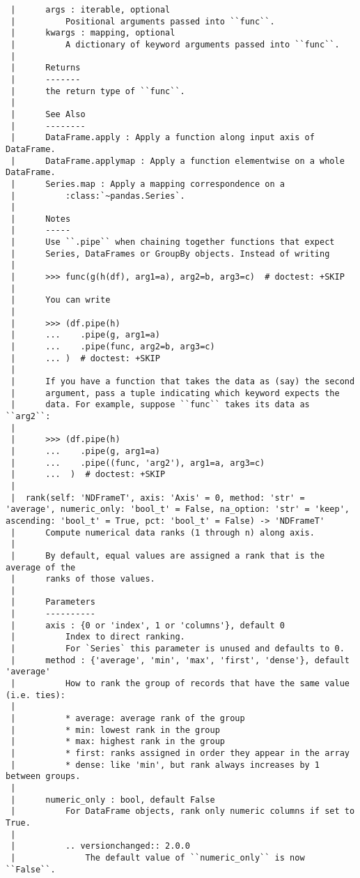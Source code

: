 \documentclass[
  letterpaper,
  DIV=11,
  numbers=noendperiod]{scrreprt}
\begin{document}
\begin{verbatim}
 |      args : iterable, optional
 |          Positional arguments passed into ``func``.
 |      kwargs : mapping, optional
 |          A dictionary of keyword arguments passed into ``func``.
 |      
 |      Returns
 |      -------
 |      the return type of ``func``.
 |      
 |      See Also
 |      --------
 |      DataFrame.apply : Apply a function along input axis of DataFrame.
 |      DataFrame.applymap : Apply a function elementwise on a whole DataFrame.
 |      Series.map : Apply a mapping correspondence on a
 |          :class:`~pandas.Series`.
 |      
 |      Notes
 |      -----
 |      Use ``.pipe`` when chaining together functions that expect
 |      Series, DataFrames or GroupBy objects. Instead of writing
 |      
 |      >>> func(g(h(df), arg1=a), arg2=b, arg3=c)  # doctest: +SKIP
 |      
 |      You can write
 |      
 |      >>> (df.pipe(h)
 |      ...    .pipe(g, arg1=a)
 |      ...    .pipe(func, arg2=b, arg3=c)
 |      ... )  # doctest: +SKIP
 |      
 |      If you have a function that takes the data as (say) the second
 |      argument, pass a tuple indicating which keyword expects the
 |      data. For example, suppose ``func`` takes its data as ``arg2``:
 |      
 |      >>> (df.pipe(h)
 |      ...    .pipe(g, arg1=a)
 |      ...    .pipe((func, 'arg2'), arg1=a, arg3=c)
 |      ...  )  # doctest: +SKIP
 |  
 |  rank(self: 'NDFrameT', axis: 'Axis' = 0, method: 'str' = 'average', numeric_only: 'bool_t' = False, na_option: 'str' = 'keep', ascending: 'bool_t' = True, pct: 'bool_t' = False) -> 'NDFrameT'
 |      Compute numerical data ranks (1 through n) along axis.
 |      
 |      By default, equal values are assigned a rank that is the average of the
 |      ranks of those values.
 |      
 |      Parameters
 |      ----------
 |      axis : {0 or 'index', 1 or 'columns'}, default 0
 |          Index to direct ranking.
 |          For `Series` this parameter is unused and defaults to 0.
 |      method : {'average', 'min', 'max', 'first', 'dense'}, default 'average'
 |          How to rank the group of records that have the same value (i.e. ties):
 |      
 |          * average: average rank of the group
 |          * min: lowest rank in the group
 |          * max: highest rank in the group
 |          * first: ranks assigned in order they appear in the array
 |          * dense: like 'min', but rank always increases by 1 between groups.
 |      
 |      numeric_only : bool, default False
 |          For DataFrame objects, rank only numeric columns if set to True.
 |      
 |          .. versionchanged:: 2.0.0
 |              The default value of ``numeric_only`` is now ``False``.

\end{verbatim}
\end{document}
